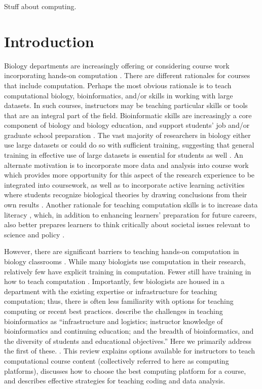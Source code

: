 Stuff about computing.

\bigskip


\bigskip
\section{Introduction}\label{sect:Introduction}


Biology departments are increasingly offering or considering course work incorporating hands-on computation
\citep{WilsonSayres18}. 
There are different rationales for courses that include computation.
Perhaps the most obvious rationale is to teach computational biology, bioinformatics,
and/or skills in working with large datasets.
In such courses, instructors may be teaching particular skills or tools that are an integral part of the field.
Bioinformatic skills are increasingly a core component of biology and biology education, and 
support students' job and/or graduate school preparation \citep{WilsonSayres18}. 
The vast majority of researchers in biology either use large datasets or could do so with sufficient training, suggesting that general training in effective use of large datasets is essential for students as well \citep{Barone17,Loman13}.
An alternate motivation is to incorporate more data and analysis into course work
which provides more opportunity for this aspect of the research experience to be
integrated into coursework, as well as to incorporate active learning activities where
students recognize biological theories by drawing conclusions from their own results
\citep{Kjelvik19}.
Another rationale for teaching computation skills is to increase data literacy \citep{Gibson18}, which, in addition to enhancing learners' preparation for future careers, also better prepares learners to think critically about societal issues relevant to science and policy \citep{cook2014}.

However, there are significant barriers to teaching hands-on computation in biology classrooms \citep{Williams17}.
While many biologists use computation in their research, relatively few have explicit training in computation. 
Fewer still have training in how to teach computation \citep{Williams17}.
Importantly, few biologists are housed in a department with the existing expertise or infrastructure for teaching computation;
thus, there is often less familiarity with options for teaching computing or recent best practices. 
\citet{Cummings10} describe the challenges in teaching bioinformatics as 
``infrastructure and logistics; instructor knowledge of bioinformatics and continuing education; and the breadth of bioinformatics, and the diversity of students and educational objectives.''
Here we primarily address the first of these. 
 \citep{Williams17}.
This review explains options available for instructors to teach computational course content
(collectively referred to here as computing platforms),
discusses how to choose the best computing platform for a course, 
and describes effective strategies for teaching coding and data analysis.


